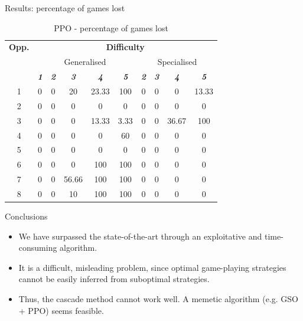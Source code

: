 \documentclass[boxes]{beamer}
\begin{document}
\begin{frame}{Results: percentage of games lost}
      \begin{table}[htbp]
        \caption{PPO - percentage of games lost}
        \begin{center}
            \begin{tabular}{|c|c|c|c|c|c|c|c|c|c|}
                \hline
              \textbf{Opp.}&\multicolumn{9}{|c|}{\textbf{Difficulty}} \\
              \cline{2-10}
                           & \multicolumn{5}{|c|}{Generalised} & \multicolumn{4}{|c|}{Specialised} \\
              \cline{2-10}
                & \textbf{\textit{1}}& \textbf{\textit{2}}& \textbf{\textit{3}} & \textbf{\textit{4}} & \textbf{\textit{5}} & \textbf{\textit{2}}& \textbf{\textit{3}} & \textbf{\textit{4}} & \textbf{\textit{5}}\\
                \hline
                 1 &  0 &  0 &     20 &  23.33 &   100 & 0 & 0 & 0     & 13.33 \\
                 2 &  0 &  0 &      0 &      0 &     0 & 0 & 0 & 0     & 0 \\
                 3 &  0 &  0 &      0 &  13.33 &  3.33 & 0 & 0 & 36.67 & 100 \\
                 4 &  0 &  0 &      0 &      0 &    60 & 0 & 0 & 0     & 0 \\
                 5 &  0 &  0 &      0 &      0 &     0 & 0 & 0 & 0     & 0 \\
                 6 &  0 &  0 &      0 &    100 &   100 & 0 & 0 & 0     & 0 \\
                 7 &  0 &  0 &  56.66 &    100 &   100 & 0 & 0 & 0     & 0 \\
                 8 &  0 &  0 &     10 &    100 &   100 & 0 & 0 & 0     & 0 \\
                \hline
            \end{tabular}
            \label{PPO against all opponents games lost}
        \end{center}
    \end{table}
\end{frame}

\begin{frame}{Conclusions}
  \begin{itemize}
  \item We have surpassed the state-of-the-art through an exploitative and time-consuming algorithm.
  \item It is a difficult, misleading problem, since optimal game-playing strategies cannot be easily inferred from suboptimal strategies.
  \item Thus, the cascade method cannot work well. A memetic algorithm (e.g. GSO + PPO) seems feasible.
  \end{itemize}
\end{frame}
\end{document}
